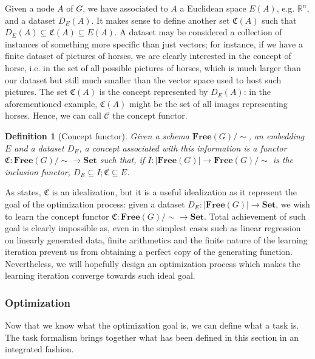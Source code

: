 \documentclass[12pt,a4paper,openright,twoside]{report}
\theoremstyle{plain}
\newtheorem{definition}[proposition]{Definition}
\theoremstyle{definition}
\begin{document}
Given a node $A$ of $G$, we have associated to $A$ a Euclidean space $E(A)$, e.g. $\mathbb{R}^n$, and a dataset $D_E(A)$. It makes sense to define another set $\mathfrak{C}(A)$ such that $D_E(A) \subseteq \mathfrak{C}(A) \subseteq E(A)$. A dataset may be considered a collection of instances of something more specific than just vectors; for instance, if we have a finite dataset of pictures of horses, we are clearly interested in the concept of horse, i.e. in the set of all possible pictures of horses, which is much larger than our dataset but still much smaller than the vector space used to host such pictures. The set $\mathfrak{C}(A)$ is the concept represented by $D_E(A)$: in the aforementioned example, $\mathfrak{C}(A)$ might be the set of all images representing horses. Hence, we can call $\mathcal{C}$ the concept functor. 

\begin{definition}[Concept functor]
  Given a schema $\mathbf{Free}(G)/{\sim}$, an embedding $E$ and a dataset $D_E$, a concept associated with this information is a functor $\mathfrak{C}: \mathbf{Free}(G)/{\sim} \to \mathbf{Set}$ such that, if $I: |\mathbf{Free}(G)| \to \mathbf{Free}(G)/{\sim}$ is the inclusion functor, $D_E \subseteq I;\mathfrak{C} \subseteq E$.
\end{definition}

As \cite{gavranovic2019compositional} states, $\mathfrak{C}$ is an idealization, but it is a useful idealization as it represent the goal of the optimization process: given a dataset $D_E: |\mathbf{Free}(G)| \to \mathbf{Set}$, we wish to learn the concept functor $\mathfrak{C}: \mathbf{Free}(G)/{\sim} \to \mathbf{Set}$. Total achievement of such goal is clearly impossible as, even in the simplest cases such as linear regression on linearly generated data, finite arithmetics and the finite nature of the learning iteration prevent us from obtaining a perfect copy of the generating function.
Nevertheless, we will hopefully design an optimization process which makes the learning iteration converge towards such ideal goal.

\subsubsection{Optimization}

Now that we know what the optimization goal is, we can define what a task is. The task formalism brings together what has been defined in this section in an integrated fashion.
\end{document}
